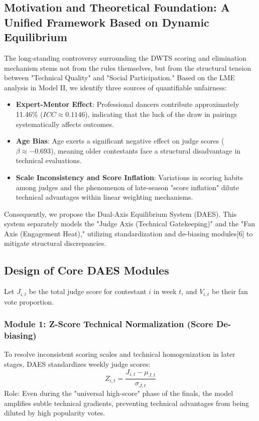 \documentclass[12pt]{article}
\begin{document}
	\subsection{Motivation and Theoretical Foundation: A Unified Framework Based on Dynamic Equilibrium}
	The long-standing controversy surrounding the DWTS scoring and elimination mechanism stems not from the rules themselves, but from the structural tension between "Technical Quality" and "Social Participation." Based on the LME analysis in Model II, we identify three sources of quantifiable unfairness:
	\begin{itemize}
		\item \textbf{Expert-Mentor Effect}: Professional dancers contribute approximately 11.46\% ($ICC \approx 0.1146$), indicating that the luck of the draw in pairings systematically affects outcomes.
		\item \textbf{Age Bias}: Age exerts a significant negative effect on judge scores ($\beta \approx -0.693$), meaning older contestants face a structural disadvantage in technical evaluations.
		\item \textbf{Scale Inconsistency and Score Inflation}: Variations in scoring habits among judges and the phenomenon of late-season "score inflation" dilute technical advantages within linear weighting mechanisms.
	\end{itemize}
	Consequently, we propose the Dual-Axis Equilibrium System (DAES). This system separately models the "Judge Axis (Technical Gatekeeping)" and the "Fan Axis (Engagement Heat)," utilizing standardization and de-biasing modules[6] to mitigate structural discrepancies.
	
	\subsection{Design of Core DAES Modules}
	Let $J_{i,t}$ be the total judge score for contestant $i$ in week $t$, and $V_{i,t}$ be their fan vote proportion.
	
	\subsubsection{Module 1: Z-Score Technical Normalization (Score De-biasing)}
	To resolve inconsistent scoring scales and technical homogenization in later stages, DAES standardizes weekly judge scores: 
	$$Z_{i,t} = \frac{J_{i,t} - \mu_{J,t}}{\sigma_{J,t}}$$
	Role: Even during the "universal high-score" phase of the finals, the model amplifies subtle technical gradients, preventing technical advantages from being diluted by high popularity votes.
	
\end{document}
